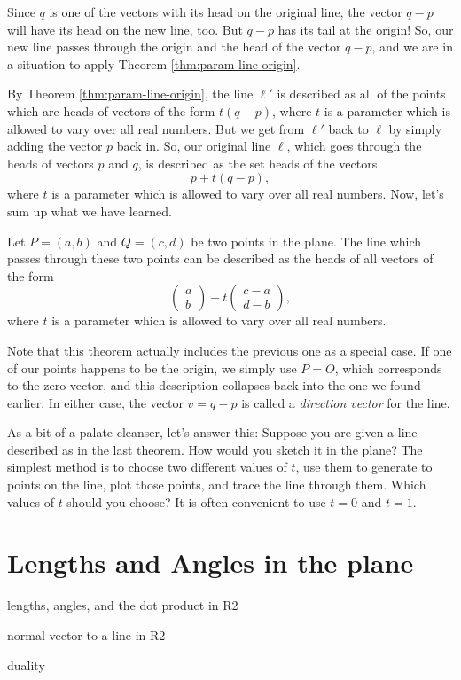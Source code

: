 \documentclass[00-livre-main.tex]{subfiles}
\begin{document}
Since $q$ is one of the vectors with its head on the original line, the vector $q-p$ will have its head on the new line, too.
But $q-p$ has its tail at the origin! 
So, our new line passes through the origin and the head of the vector $q-p$, and we are in a situation to apply Theorem \ref{thm:param-line-origin}.


By Theorem \ref{thm:param-line-origin}, the line $\ell'$ is described as all of the points which are heads of vectors of the form
$t (q-p)$, where $t$ is a parameter which is allowed to vary over all real numbers.
But we get from $\ell'$ back to $\ell$ by simply adding the vector $p$ back in. 
So, our original line $\ell$, which goes through the heads of vectors $p$ and $q$, is described as the set heads of the vectors 
\[
p + t (q-p),
\] 
where $t$ is a parameter which is allowed to vary over all real numbers.
Now, let's sum up what we have learned.

\begin{theorem}\label{thm:param-line}
Let $P = (a,b)$ and $Q = (c,d)$ be two points in the plane. The line which passes through these two points can be described as the heads of all vectors of the form
\[
\begin{pmatrix} a \\ b \end{pmatrix} + t \begin{pmatrix} c-a \\ d-b\end{pmatrix},
\]
where $t$ is a parameter which is allowed to vary over all real numbers.
\end{theorem}

Note that this theorem actually includes the previous one as a special case. 
If one of our points happens to be the origin, we simply use $P=O$, which corresponds to the zero vector, and this description collapses back into the one we found earlier.
In either case, the vector $v= q-p$ is called a \emph{direction vector} for the line.


As a bit of a palate cleanser, let's answer this: Suppose you are given a line described as in the last theorem. How would you sketch it in the plane? The simplest method is to choose two different values of $t$, use them to generate to points on the line, plot those points, and trace the line through them. Which values of $t$ should you choose? It is often convenient to use $t=0$ and $t=1$.



\section*{Lengths and Angles in the plane}
\begin{compactitem}
\item lengths, angles, and the dot product in R2
\item normal vector to a line in R2
\item duality
\end{compactitem}
\end{document}

